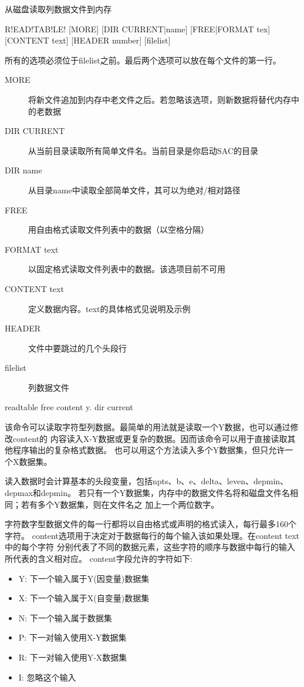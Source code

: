 \label{cmd:readtable}

从磁盘读取列数据文件到内存

\begin{SACSTX}
R!EAD!TAB!LE! [MORE] [DIR CURRENT|name] [FREE|FORMAT tex]
    [CONTENT text] [HEADER number] [filelist]
\end{SACSTX}
所有的选项必须位于filelist之前。最后两个选项可以放在每个文件的第一行。

\begin{description}
\item [MORE] 将新文件追加到内存中老文件之后。若忽略该选项，则新数据将替代内存中的老数据
\item [DIR CURRENT] 从当前目录读取所有简单文件名。当前目录是你启动SAC的目录
\item [DIR name] 从目录name中读取全部简单文件，其可以为绝对/相对路径
\item [FREE] 用自由格式读取文件列表中的数据（以空格分隔）
\item [FORMAT text] 以固定格式读取文件列表中的数据。该选项目前不可用
\item [CONTENT text] 定义数据内容。text的具体格式见说明及示例
\item [HEADER] 文件中要跳过的几个头段行
\item [filelist] 列数据文件
\end{description}

\begin{SACDFT}
readtable free content y. dir current
\end{SACDFT}

该命令可以读取字符型列数据。最简单的用法就是读取一个Y数据，也可以通过修改content的
内容读入X-Y数据或更复杂的数据。因而该命令可以用于直接读取其他程序输出的复杂格式数据。
也可以用这个方法读入多个Y数据集，但只允许一个X数据集。

读入数据时会计算基本的头段变量，包括npts、b、e、delta、leven、depmin、depmax和depmin。
若只有一个Y数据集，内存中的数据文件名将和磁盘文件名相同；若有多个Y数据集，则在文件名之
加上一个两位数字。

字符数字型数据文件的每一行都将以自由格式或声明的格式读入，每行最多160个字符。
content选项用于决定对于数据每行的每个输入该如果处理。在content text中的每个字符
分别代表了不同的数据元素，这些字符的顺序与数据中每行的输入所代表的含义相对应。
content字段允许的字符如下:
\begin{itemize}
\item Y: 下一个输入属于Y(因变量)数据集
\item X: 下一个输入属于X(自变量)数据集
\item N: 下一个输入属于数据集
\item P: 下一对输入使用X-Y数据集
\item R: 下一对输入使用Y-X数据集
\item I: 忽略这个输入
\end{itemize}

